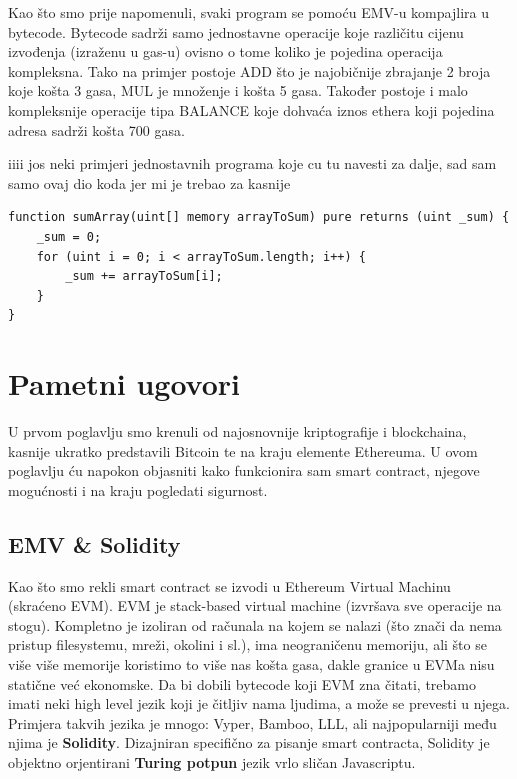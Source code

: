 \documentclass[12pt]{report}
\begin{document}
Kao što smo prije napomenuli, svaki program se pomoću EMV-u kompajlira u bytecode. Bytecode sadrži samo jednostavne operacije koje različitu cijenu izvođenja (izraženu u gas-u) ovisno o tome koliko je pojedina operacija kompleksna. Tako na primjer postoje ADD što je najobičnije zbrajanje 2 broja koje košta 3 gasa, MUL je množenje i košta 5 gasa. Također postoje i malo kompleksnije operacije tipa BALANCE koje dohvaća iznos ethera koji pojedina adresa sadrži košta 700 gasa.

iiii jos neki primjeri jednostavnih programa koje cu tu navesti za dalje, sad sam samo ovaj dio koda jer mi je trebao za kasnije

\begin{minipage}{\linewidth}
\begin{lstlisting}[caption = Primjer 1, language=solidity, label={lst:suma}]
function sumArray(uint[] memory arrayToSum) pure returns (uint _sum) {
    _sum = 0;
    for (uint i = 0; i < arrayToSum.length; i++) {
        _sum += arrayToSum[i];
    }
}
\end{lstlisting}
\end{minipage}

\chapter{Pametni ugovori}

U prvom poglavlju smo krenuli od najosnovnije kriptografije i blockchaina, kasnije ukratko predstavili Bitcoin te na kraju elemente Ethereuma. U ovom poglavlju ću napokon objasniti kako funkcionira sam smart contract, njegove mogućnosti i na kraju pogledati sigurnost.

\section{EMV \& Solidity}

Kao što smo rekli smart contract se izvodi u Ethereum Virtual Machinu (skraćeno EVM). EVM je stack-based virtual machine (izvršava sve operacije na stogu). Kompletno je izoliran od računala na kojem se nalazi (što znači da nema pristup filesystemu, mreži, okolini i sl.), ima neograničenu memoriju, ali što se više više memorije koristimo to više nas košta gasa, dakle granice u EVMa nisu statične već ekonomske. Da bi dobili bytecode koji EVM zna čitati, trebamo imati neki high level jezik koji je čitljiv nama ljudima, a može se prevesti u njega. Primjera takvih jezika je mnogo: Vyper, Bamboo, LLL, ali najpopularniji među njima je \textbf{Solidity}. Dizajniran specifično za pisanje smart contracta, Solidity je objektno orjentirani \textbf{Turing potpun} jezik vrlo sličan Javascriptu.
\end{document}
